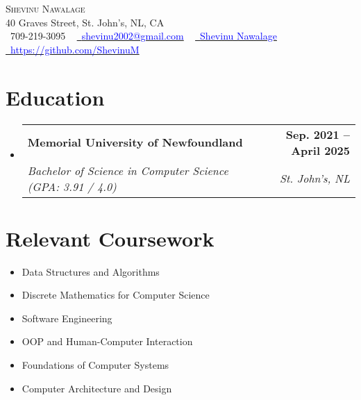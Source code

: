 \documentclass[letterpaper,11pt]{article}
\makeatletter
\newcommand{\resumeSubheading}[4]{
  \vspace{-2pt}\item
    \begin{tabular*}{1.0\textwidth}[t]{l@{\extracolsep{\fill}}r}
      \textbf{#1} & \textbf{\small #2} \\
      \textit{\small#3} & \textit{\small #4} \\
    \end{tabular*}\vspace{-7pt}
}
\newcommand{\resumeSubHeadingListStart}{\begin{itemize}[leftmargin=0.0in, label={}]}
\newcommand{\resumeSubHeadingListEnd}{\end{itemize}}
\makeatother
\begin{document}

\begin{center}
    {\Huge \scshape Shevinu Nawalage} \\ \vspace{1pt}
    40 Graves Street, St. John's, NL, CA \\ \vspace{1pt}
    \small \raisebox{-0.1\height}\faPhone\ 709-219-3095 ~ \href{mailto:shevinu2002@gmail.com}{\raisebox{-0.2\height}\faEnvelope\  {\textcolor{blue}{shevinu2002@gmail.com}}} ~ 
    \href{https://www.linkedin.com/in/shevinu-nawalage-a109371bb/}{\raisebox{-0.2\height}\faLinkedin\ {\textcolor{blue}{Shevinu Nawalage}}}  ~
    \href{https://github.com/ShevinuM}{\raisebox{-0.2\height}\faGithub\ {\textcolor{blue}{https://github.com/ShevinuM}}}
    \vspace{-8pt}
\end{center}


\section{Education}
  \resumeSubHeadingListStart
    \resumeSubheading
      {Memorial University of Newfoundland}{Sep. 2021 -- April 2025}
      {Bachelor of Science in Computer Science (GPA: 3.91 / 4.0)}{St. John's, NL}
  \resumeSubHeadingListEnd
\section{Relevant Coursework}
        \begin{multicols}{1}
            \begin{itemize}[itemsep=-5pt, parsep=3pt]
                \item\small Data Structures and Algorithms
                \item Discrete Mathematics for Computer Science
                \item Software Engineering 
                \item OOP and Human-Computer Interaction
                \item Foundations of Computer Systems
                \item Computer Architecture and Design
            \end{itemize}
        \end{multicols}
        \vspace*{2.0\multicolsep}
\end{document}
